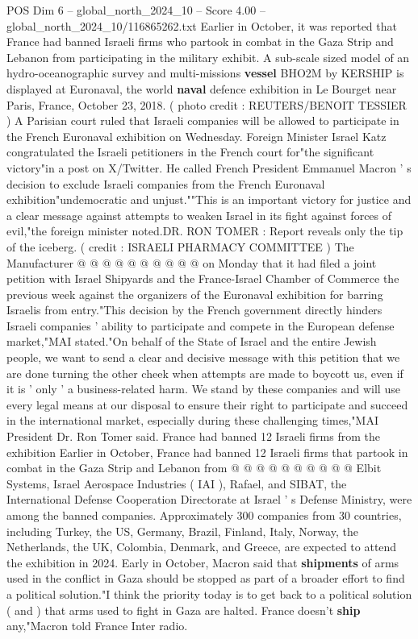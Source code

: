 \begin{textsample}{POS Dim 6 – global\_north\_2024\_10 – Score 4.00 – global\_north\_2024\_10/116865262.txt}  \label{ex:f6_pos_376}
Earlier in October, it was reported that France had banned Israeli firms who partook in combat in the Gaza Strip and Lebanon from participating in the military exhibit.
A sub-scale sized model of an hydro-oceanographic survey and multi-missions \textbf{vessel} BHO2M by KERSHIP is displayed at Euronaval, the world \textbf{naval} defence exhibition in Le Bourget near Paris, France, October 23, 2018. ( photo credit : REUTERS/BENOIT TESSIER ) A Parisian court ruled that Israeli companies will be allowed to participate in the French Euronaval exhibition on Wednesday.
Foreign Minister Israel Katz congratulated the Israeli petitioners in the French court for"the significant victory"in a post on X/Twitter.
He called French President Emmanuel Macron ' s decision to exclude Israeli companies from the French Euronaval exhibition"undemocratic and unjust.""This is an important victory for justice and a clear message against attempts to weaken Israel in its fight against forces of evil,"the foreign minister noted.DR.
RON TOMER : Report reveals only the tip of the iceberg. ( credit : ISRAELI PHARMACY COMMITTEE ) The Manufacturer @ @ @ @ @ @ @ @ @ @ on Monday that it had filed a joint petition with Israel Shipyards and the France-Israel Chamber of Commerce the previous week against the organizers of the Euronaval exhibition for barring Israelis from entry."This decision by the French government directly hinders Israeli companies ' ability to participate and compete in the European defense market,"MAI stated."On behalf of the State of Israel and the entire Jewish people, we want to send a clear and decisive message with this petition that we are done turning the other cheek when attempts are made to boycott us, even if it is ' only ' a business-related harm.
We stand by these companies and will use every legal means at our disposal to ensure their right to participate and succeed in the international market, especially during these challenging times,"MAI President Dr.
Ron Tomer said.
France had banned 12 Israeli firms from the exhibition Earlier in October, France had banned 12 Israeli firms that partook in combat in the Gaza Strip and Lebanon from @ @ @ @ @ @ @ @ @ @ Elbit Systems, Israel Aerospace Industries ( IAI ), Rafael, and SIBAT, the International Defense Cooperation Directorate at Israel ' s Defense Ministry, were among the banned companies.
Approximately 300 companies from 30 countries, including Turkey, the US, Germany, Brazil, Finland, Italy, Norway, the Netherlands, the UK, Colombia, Denmark, and Greece, are expected to attend the exhibition in 2024.
Early in October, Macron said that \textbf{shipments} of arms used in the conflict in Gaza should be stopped as part of a broader effort to find a political solution."I think the priority today is to get back to a political solution ( and ) that arms used to fight in Gaza are halted.
France doesn't \textbf{ship} any,"Macron told France Inter radio.

\end{textsample}
